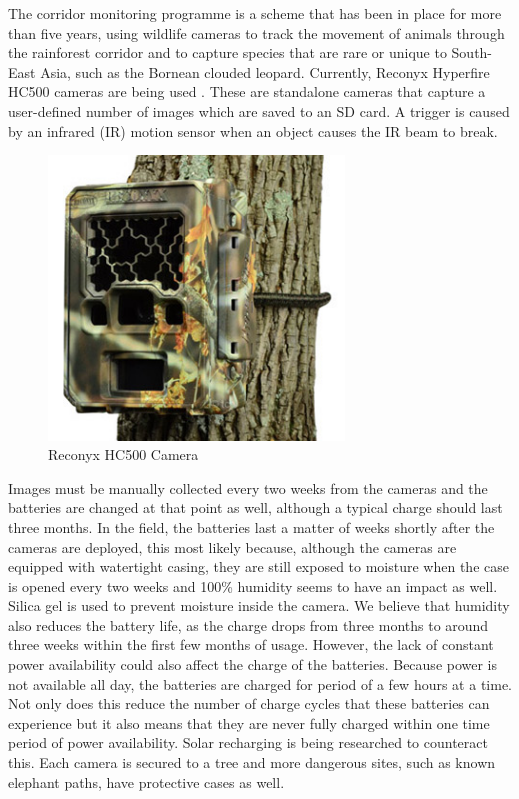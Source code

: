 The corridor monitoring programme is a scheme that has been in place for more than five years, using wildlife cameras to track the movement of animals through the rainforest corridor and to capture species that are rare or unique to South-East Asia, such as the Bornean clouded leopard. Currently, Reconyx Hyperfire HC500 cameras are being used \cite{Reconyx}. These are standalone cameras that capture a user-defined number of images which are saved to an SD card. A trigger is caused by an infrared (IR) motion sensor when an object causes the IR beam to break. 
	
	\begin{figure}[h]
		\centering
		\includegraphics[width=0.7\textwidth]{Chap3/figures/hc500}
		\caption{Reconyx HC500 Camera}
		\label{tech:fig:map}
		\end{figure}

Images must be manually collected every two weeks from the cameras and the batteries are changed at that point as well, although a typical charge should last three months. In the field, the batteries last a matter of weeks shortly after the cameras are deployed, this most likely because, although the cameras are equipped with watertight casing, they are still exposed to moisture when the case is opened every two weeks and 100\% humidity seems to have an impact as well. Silica gel is used to prevent moisture inside the camera. We believe that humidity also reduces the battery life, as the charge drops from three months to around three weeks within the first few months of usage. However, the lack of constant power availability could also affect the charge of the batteries. Because power is not available all day, the batteries are charged for period of a few hours at a time. Not only does this reduce the number of charge cycles that these batteries can experience but it also means that they are never fully charged within one time period of power availability. Solar recharging is being researched to counteract this. Each camera is secured to a tree and more dangerous sites, such as known elephant paths, have protective cases as well. 

